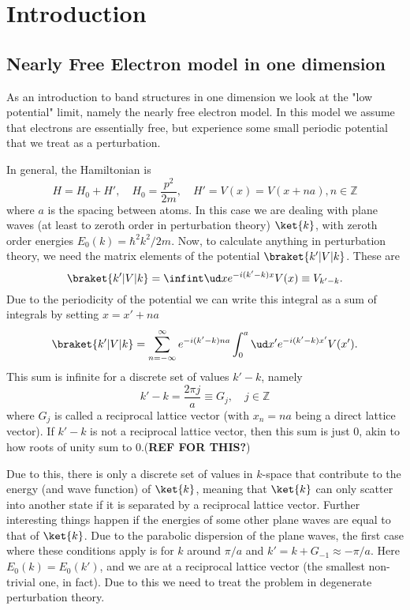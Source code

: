 \documentclass[main.tex]{subfiles}
\begin{document}
	\section{Introduction}
	
	
	\subsection{Nearly Free Electron model in one dimension}
	As an introduction to band structures in one dimension we look at the "low potential" limit, namely the nearly free electron model. In this model we assume that electrons are essentially free, but experience some small periodic potential that we treat as a perturbation.
	
	In general, the Hamiltonian is
	\begin{equation}\label{key}
		H = H_0 + H', \quad H_0 = \frac{p^2}{2m}, \quad H' = V(x) = V(x + na), n \in \mathbb{Z}
	\end{equation}
	where $ a $ is the spacing between atoms. In this case we are dealing with plane waves (at least to zeroth order in perturbation theory) $ \ket{k} $, with zeroth order energies $ E_0(k)= \hbar^2 k^2/2m $. Now, to calculate anything in perturbation theory, we need the matrix elements of the potential $ \braket{k' | V | k} $. These are
	\begin{equation}\label{key}
		\braket{k' | V | k} = \infint \ud x e^{-i(k'-k)x} V(x) \equiv V_{k'-k}.
	\end{equation}
	Due to the periodicity of the potential we can write this integral as a sum of integrals by setting $ x=x'+na $
	\begin{equation}\label{key}
		\braket{k' | V | k} = \sum_{n = -\infty}^{\infty} e^{-i(k'-k) na} \int_{0}^{a} \ud x' e^{-i(k'-k)x'} V(x').
	\end{equation}
	This sum is infinite for a discrete set of values $ k'-k $, namely
	\begin{equation}\label{key}
		k'-k = \frac{2\pi j}{a} \equiv G_j, \quad j \in \mathbb{Z}
	\end{equation}
	where $ G_j $ is called a reciprocal lattice vector (with $ x_n=na $ being a direct lattice vector). If $ k'-k $ is not a reciprocal lattice vector, then this sum is just 0, akin to how roots of unity sum to 0.(\textbf{REF FOR THIS?})
	
	Due to this, there is only a discrete set of values in $ k $-space that contribute to the energy (and wave function) of $ \ket{k} $, meaning that $ \ket{k} $ can only scatter into another state if it is separated by a reciprocal lattice vector. Further interesting things happen if the energies of some other plane waves are equal to that of $ \ket{k} $. Due to the parabolic dispersion of the plane waves, the first case where these conditions apply is for $ k $ around $ \pi/a $ and $ k'=k + G_{-1} \approx -\pi/a $. Here $ E_0(k) = E_0(k') $, and we are at a reciprocal lattice vector (the smallest non-trivial one, in fact). Due to this we need to treat the problem in degenerate perturbation theory.
	
\end{document}
